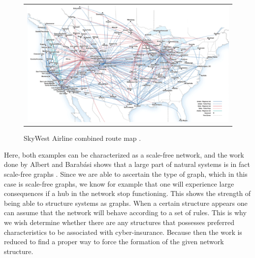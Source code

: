 \begin{figure}[h]
\centering
\begin{tabular}{@{}c@{}}
\includegraphics[width=1.0\textwidth]{../Figures/airlineRoutesUSA.png}
\end{tabular}
\caption[Caption for LOF]{SkyWest Airline combined route map \cite{airlineRoutes}.
\label{fig:airlineRouteMap}}
\end{figure}

Here, both examples can be characterized as a scale-free network, and the work done by Albert and Barabási shows that a large part of natural systems is in fact scale-free graphs \cite{audestad}. Since we are able to ascertain the type of graph, which in this case is scale-free graphs, we know for example that one will experience large consequences if a hub in the network stop functioning. 
This shows the strength of being able to structure systems as graphs. When a certain structure appears one can assume that the network will behave according to a set of rules. This is why we wish determine whether there are any structures that possesses preferred characteristics to be associated with cyber-insurance. Because then the work is reduced to find a proper way to force the formation of the given network structure.










